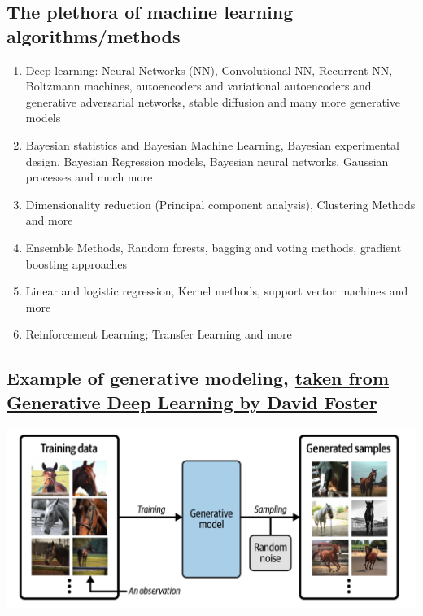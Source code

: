 \documentclass[%
oneside,                 %
final,                   %
10pt]{article}
\begin{document}
\subsection{The plethora  of machine learning algorithms/methods}

\begin{enumerate}
\item Deep learning: Neural Networks (NN), Convolutional NN, Recurrent NN, Boltzmann machines, autoencoders and variational autoencoders  and generative adversarial networks, stable diffusion and many more generative models

\item Bayesian statistics and Bayesian Machine Learning, Bayesian experimental design, Bayesian Regression models, Bayesian neural networks, Gaussian processes and much more

\item Dimensionality reduction (Principal component analysis), Clustering Methods and more

\item Ensemble Methods, Random forests, bagging and voting methods, gradient boosting approaches 

\item Linear and logistic regression, Kernel methods, support vector machines and more

\item Reinforcement Learning; Transfer Learning and more 
\end{enumerate}

\noindent
\subsection{Example of generative modeling, \href{{https://www.oreilly.com/library/view/generative-deep-learning/9781098134174/ch01.html}}{taken from Generative Deep Learning by David Foster}}

\vspace{6mm}

\centerline{\includegraphics[width=1.0\linewidth]{figures/generativelearning.png}}
\end{document}
